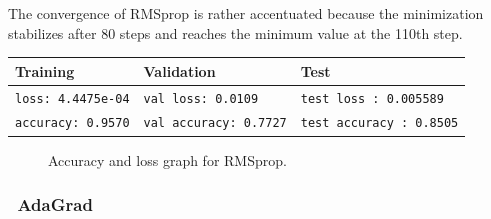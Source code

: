 \documentclass[lnbip]{svmultln}
\begin{document}
	The convergence of RMSprop is rather accentuated because the minimization stabilizes after 80 steps and reaches the minimum value at the 110th step.
	\begin{table}[H]
		\centering
		\begin{tabular}{l|l|l}
			\hline
			\textbf{Training} & \textbf{Validation} & \textbf{Test} \\
			\hline
			
			\texttt{loss: 4.4475e-04} & \texttt{val loss: 0.0109} & \texttt{test loss : 0.005589} \\
			\texttt{accuracy: 0.9570} & \texttt{val accuracy: 0.7727} & \texttt{test accuracy : 0.8505} \\
			
			\hline
			
		\end{tabular}
	\end{table}
	\begin{figure}[H]
		
		 \quad
		
		\caption{Accuracy and loss graph for RMSprop.}
		\label{fig:1}
	\end{figure}
	
	
	\subsubsection*{\qquad \textbullet \ \textbf{AdaGrad}}
	
\end{document}
